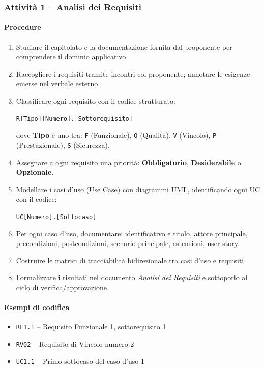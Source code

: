 \documentclass[a4paper, 11pt, oneside]{scrartcl}
\begin{document}
\subsubsection{Attività 1 – Analisi dei Requisiti{\scriptsize{}}}

\paragraph{Procedure}
\begin{enumerate}
    \item Studiare il capitolato{\scriptsize{}} e la documentazione fornita dal proponente per comprendere il dominio applicativo.
    \item Raccogliere i requisiti tramite incontri col proponente; annotare le esigenze emerse nel verbale esterno.
    \item Classificare ogni requisito con il codice strutturato:
    \begin{center}
        \texttt{R[Tipo][Numero].[Sottorequisito]}
    \end{center}
    dove \textbf{Tipo} è uno tra: \texttt{F} (Funzionale), \texttt{Q} (Qualità), \texttt{V} (Vincolo), \texttt{P} (Prestazionale), \texttt{S} (Sicurezza).
    \item Assegnare a ogni requisito una priorità: \textbf{Obbligatorio}, \textbf{Desiderabile} o \textbf{Opzionale}.
    \item Modellare i casi d'uso (Use Case) con diagrammi UML{\scriptsize{}}, identificando ogni UC con il codice:
    \begin{center}
        \texttt{UC[Numero].[Sottocaso]}
    \end{center}
    \item Per ogni caso d'uso, documentare: identificativo e titolo, attore principale, precondizioni, postcondizioni, scenario principale, estensioni, user story.
    \item Costruire le matrici di tracciabilità bidirezionale tra casi d'uso e requisiti.
    \item Formalizzare i risultati nel documento \emph{Analisi dei Requisiti}{\scriptsize{}} e sottoporlo al ciclo di verifica/approvazione.
\end{enumerate}

\paragraph{Esempi di codifica}
\begin{itemize}
    \item \texttt{RF1.1} – Requisito Funzionale 1, sottorequisito 1
    \item \texttt{RV02} – Requisito di Vincolo numero 2
    \item \texttt{UC1.1} – Primo sottocaso del caso d'uso 1
\end{itemize}
\end{document}
